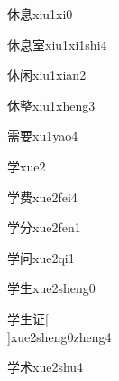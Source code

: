 \begin{verbete}[6;10]{休息}{xiu1xi0}
\end{verbete}

\begin{verbete}[6;10;9]{休息室}{xiu1xi1shi4}
\end{verbete}

\begin{verbete}[6;7]{休闲}{xiu1xian2}
\end{verbete}

\begin{verbete}[6;16]{休整}{xiu1xheng3}
\end{verbete}

\begin{verbete}[14;9]{需要}{xu1yao4}
\end{verbete}

\begin{verbete}[8]{学}{xue2}
\end{verbete}

\begin{verbete}[8;9]{学费}{xue2fei4}
\end{verbete}

\begin{verbete}[8;4]{学分}{xue2fen1}
\end{verbete}

\begin{verbete}[8;12]{学问}{xue2qi1}
\end{verbete}

\begin{verbete}[8;5]{学生}{xue2sheng0}
\end{verbete}

\begin{verbete}[8;5;7]{学生证}[\\]{xue2sheng0zheng4}
\end{verbete}

\begin{verbete}[8;5]{学术}{xue2shu4}
\end{verbete}

